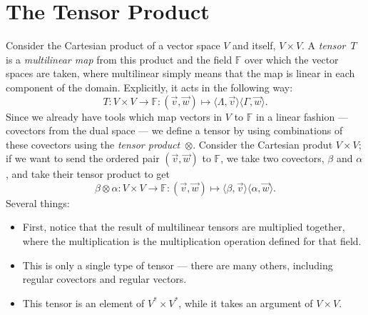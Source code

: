 \chapter{The Tensor Product}
Consider the Cartesian product of a vector space $V$ and itself, $V \times V$. A \emph{tensor}~$T$ is a \emph{multilinear map} from this product and the field $\mathbb{F}$ over which the vector spaces are taken, where multilinear simply means that the map is linear in each component of the domain. Explicitly, it acts in the following way:
\[ T : V \times V \to \mathbb{F} : (\vec{v}, \vec{w}) \mapsto \langle \Lambda, \vec{v} \rangle\langle \Gamma, \vec{w} \rangle. \]
Since we already have tools which map vectors in $V$ to $\mathbb{F}$ in a linear fashion --- covectors from the dual space --- we define a tensor by using combinations of these covectors using the \emph{tensor product}~$\otimes$.
Consider the Cartesian produt $V \times V$; if we want to send the ordered pair $(\vec{v}, \vec{w})$ to $\mathbb{F}$, we take two covectors, $\beta$ and $\alpha$, and take their tensor product to get
\[ \beta \otimes \alpha : V \times V \to \mathbb{F} : (\vec{v},\vec{w}) \mapsto \langle \beta, \vec{v} \rangle\langle \alpha, \vec{w} \rangle. \]
Several things:
\begin{itemize}
    \item First, notice that the result of multilinear tensors are multiplied together, where the multiplication is the multiplication operation defined for that field.
    \item This is only a single type of tensor --- there are many others, including regular covectors and regular vectors.
    \item This tensor is an element of $V^* \times V^*$, while it takes an argument of $V \times V$.
\end{itemize}

